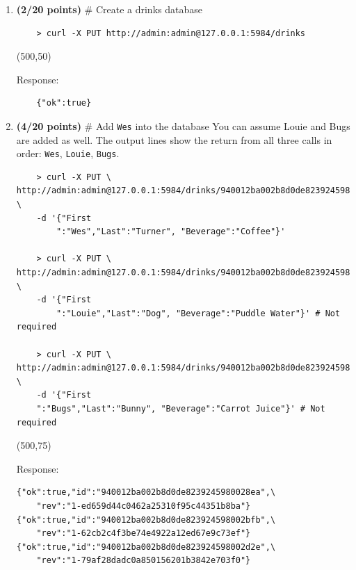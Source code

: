 \documentclass[10pt]{article}
\begin{document}
\begin{enumerate}
\begin{enumerate}
\hspace*{-0.4in}\framebox(500,50){}

		\fi
	
	Response:
	\begin{lstlisting}
{"uuids":["940012ba002b8d0de8239245980028ea","940012ba002b8d0de823924598002bfb",\
	"940012ba002b8d0de823924598002d2e"]}
	\end{lstlisting}

	\item \textbf{(2/20 points)} \# Create a drinks database 
	
\beginanswers	
\begin{lstlisting}
	> curl -X PUT http://admin:admin@127.0.0.1:5984/drinks
\end{lstlisting}
\else


\hspace*{-0.4in}\framebox(500,50){}


\fi

Response:
\begin{lstlisting}
	{"ok":true}
\end{lstlisting}

\newpage

	\item \textbf{(4/20 points)} \# Add \verb*|Wes| into the database You can assume Louie and Bugs are added as well. The output lines show the return from all three calls in order: \verb*|Wes|, \verb*|Louie|, \verb*|Bugs|. 

\beginanswers	
\begin{lstlisting}
	> curl -X PUT \ http://admin:admin@127.0.0.1:5984/drinks/940012ba002b8d0de8239245980028ea \
	-d '{"First
		":"Wes","Last":"Turner", "Beverage":"Coffee"}'
   
    > curl -X PUT \ http://admin:admin@127.0.0.1:5984/drinks/940012ba002b8d0de823924598002bfb \
    -d '{"First
    	":"Louie","Last":"Dog", "Beverage":"Puddle Water"}' # Not required
    
 	> curl -X PUT \ http://admin:admin@127.0.0.1:5984/drinks/940012ba002b8d0de823924598002d2e \
 	-d '{"First
	":"Bugs","Last":"Bunny", "Beverage":"Carrot Juice"}' # Not required
\end{lstlisting}
\else


\hspace*{-0.4in}\framebox(500,75){}


\fi
Response:
\begin{lstlisting}
{"ok":true,"id":"940012ba002b8d0de8239245980028ea",\
	"rev":"1-ed659d44c0462a25310f95c44351b8ba"}
{"ok":true,"id":"940012ba002b8d0de823924598002bfb",\
	"rev":"1-62cb2c4f3be74e4922a12ed67e9c73ef"}
{"ok":true,"id":"940012ba002b8d0de823924598002d2e",\
	"rev":"1-79af28dadc0a850156201b3842e703f0"}
\end{lstlisting}


\end{enumerate}
\end{enumerate}
\end{document}
